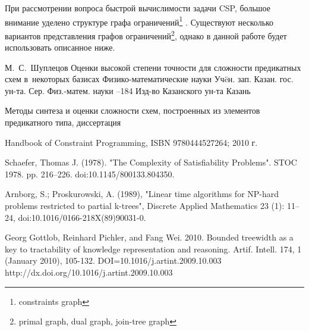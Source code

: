 \documentclass[12pt]{article}
\begin{document}
При рассмотрении вопроса быстрой вычислимости задачи CSP, большое внимание уделено структуре графа ограничений\footnote{constraints graph} \cite{CSP10}.
Существуют несколько вариантов представления графов ограничений\footnote{primal graph, dual graph, join-tree graph}, однако в данной работе
будет использовать описанное ниже.
\clearpage
{}
    \by М.~С.~Шуплецов
    \paper Оценки высокой степени точности для сложности предикатных схем в~некоторых базисах
    \inbook Физико-математические науки
    \serial Уч\"eн. зап. Казан. гос. ун-та. Сер. Физ.-матем. науки
    --184
    \publ Изд-во Казанского ун-та
    \publaddr Казань

Методы синтеза и оценки сложности схем, построенных из элементов предикатного типа, диссертация

 Handbook of Constraint Programming, ISBN 9780444527264; 2010 г.

 Schaefer, Thomas J. (1978). "The Complexity of Satisfiability Problems". STOC 1978. pp. 216–226. doi:10.1145/800133.804350.

 Arnborg, S.; Proskurowski, A. (1989), "Linear time algorithms for NP-hard problems restricted to partial k-trees", Discrete Applied Mathematics 23 (1): 11–24, doi:10.1016/0166-218X(89)90031-0.

Georg Gottlob, Reinhard Pichler, and Fang Wei. 2010. Bounded treewidth as a key to tractability of knowledge representation and reasoning. Artif. Intell. 174, 1 (January 2010), 105-132. DOI=10.1016/j.artint.2009.10.003 http://dx.doi.org/10.1016/j.artint.2009.10.003

\endthebibliography
\end{document}
